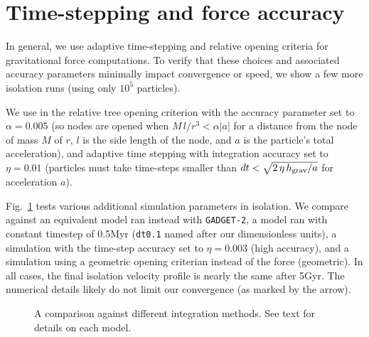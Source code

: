 \section{Time-stepping and force
accuracy}\label{time-stepping-and-force-accuracy}

In general, we use adaptive time-stepping and relative opening criteria
for gravitational force computations. To verify that these choices and
associated accuracy parameters minimally impact convergence or speed, we
show a few more isolation runs (using only \(10^5\) particles).

We use in \gadget{} the relative tree opening criterion with the
accuracy parameter set to \(\alpha =0.005\) (so nodes are opened when
\(M\,l/r^3 < \alpha |a|\) for a distance from the node of mass \(M\) of
\(r\), \(l\) is the side length of the node, and \(a\) is the particle's
total acceleration), and adaptive time stepping with integration
accuracy set to \(\eta=0.01\) (particles must take time-steps smaller
than \(dt < \sqrt{2\,\eta\,h_{\rm grav} / a}\) for acceleration \(a\)).

Fig.~\ref{fig:methods_convergence} tests various additional simulation
parameters in isolation. We compare against an equivalent model ran
instead with \texttt{GADGET-2}, a model ran with constant timestep of
0.5Myr (\texttt{dt0.1} named after our dimensionless units), a
simulation with the time-step accuracy set to \(\eta=0.003\) (high
accuracy), and a simulation using a geometric opening criterian instead
of the force (geometric). In all cases, the final isolation velocity
profile is nearly the same after 5Gyr. The numerical details likely do
not limit our convergence (as marked by the arrow).

\begin{figure}
\centering
{}
\caption[Isolation method convergence]{A comparison against different
integration methods. See text for details on each
model.}\label{fig:methods_convergence}
\end{figure}
